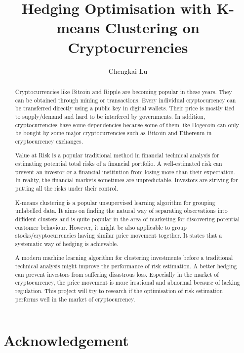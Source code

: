 \documentclass[11pt]{article} %
\title{Hedging Optimisation with K-means Clustering on Cryptocurrencies}
\author{Chengkai Lu}
\theoremstyle{plain}
\theoremstyle{definition}
\begin{document}
\maketitle

\declaration

\begin{abstract}
\thispagestyle{plain}
Cryptocurrencies like Bitcoin and Ripple are becoming popular in these years. They can be obtained through mining or transactions. Every individual cryptocurrency can be transferred directly using a public key in digital wallets. Their price is mostly tied to supply/demand and hard to be interfered by governments. In addition, cryptocurrencies have some dependencies because some of them like Dogecoin can only be bought by some major cryptocurrencies such as Bitcoin and Ethereum in cryptocurrency exchanges.

Value at Risk is a popular traditional method in financial technical analysis for estimating potential total risks of a financial portfolio. A well-estimated risk can prevent an investor or a financial institution from losing more than their expectation. In reality, the financial markets sometimes are unpredictable. Investors are striving for putting all the risks under their control.

K-means clustering is a popular unsupervised learning algorithm for grouping unlabelled data. It aims on finding the natural way of separating observations into diffident clusters and is quite popular in the area of marketing for discovering potential customer behaviour. However, it might be also applicable to group stocks/cryptocurrencies having similar price movement together. It states that a systematic way of hedging is achievable.

A modern machine learning algorithm for clustering investments before a traditional technical analysis might improve the performance of risk estimation. A better hedging can prevent investors from suffering disastrous loss. Especially in the market of cryptocurrency, the price movement is more irrational and abnormal because of lacking regulation. This project will try to research if the optimisation of risk estimation performs well in the market of cryptocurrency.
\end{abstract}

\listoffigures
\listoftables
\setcounter{page}{4}

\clearpage

\section*{\hfil Acknowledgement \hfil}
\end{document}
